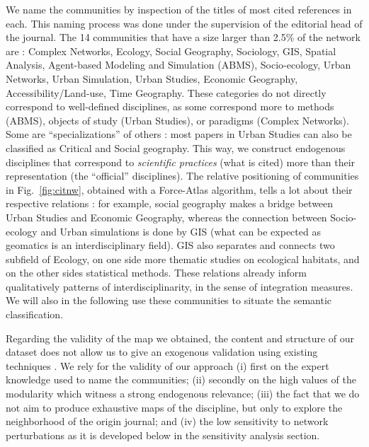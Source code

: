 We name the communities by inspection of the titles of most cited references in each. This naming process was done under the supervision of the editorial head of the journal. The 14 communities that have a size larger than 2.5\% of the network are : Complex Networks, Ecology, Social Geography, Sociology, GIS, Spatial Analysis, Agent-based Modeling and Simulation (ABMS), Socio-ecology, Urban Networks, Urban Simulation, Urban Studies, Economic Geography, Accessibility/Land-use, Time Geography. These categories do not directly correspond to well-defined disciplines, as some correspond more to methods (ABMS), objects of study (Urban Studies), or paradigms (Complex Networks). Some are ``specializations'' of others : most papers in Urban Studies can also be classified as Critical and Social geography. This way, we construct endogenous disciplines that correspond to \emph{scientific practices} (what is cited) more than their representation (the ``official'' disciplines). The relative positioning of communities in Fig.~\ref{fig:citnw}, obtained with a Force-Atlas algorithm, tells a lot about their respective relations : for example, social geography makes a bridge between Urban Studies and Economic Geography, whereas the connection between Socio-ecology and Urban simulations is done by GIS (what can be expected as geomatics is an interdisciplinary field). GIS also separates and connects two subfield of Ecology, on one side more thematic studies on ecological habitats, and on the other sides statistical methods. These relations already inform qualitatively patterns of interdisciplinarity, in the sense of integration measures. We will also in the following use these communities to situate the semantic classification.

Regarding the validity of the map we obtained, the content and structure of our dataset does not allow us to give an exogenous validation using existing techniques \cite{boyack2005mapping}. We rely for the validity of our approach (i) first on the expert knowledge used to name the communities; (ii) secondly on the high values of the modularity which witness a strong endogenous relevance; (iii) the fact that we do not aim to produce exhaustive maps of the discipline, but only to explore the neighborhood of the origin journal; and (iv) the low sensitivity to network perturbations as it is developed below in the sensitivity analysis section.







